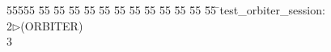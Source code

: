 %
%
\begin{tabbing}
55555 \= 55 \= 55 \= 55 \= 55 \= 55 \= 55 \= 55 \= 55 \= 55 \= 55 \= 55 \= 55 \= \>test\_orbiter\_session:\\[0pt]
2\>$\triangleright$\>(ORBITER)\\[0pt]
3\>\end{tabbing}

